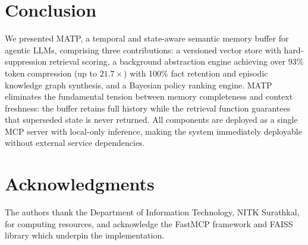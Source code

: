 \documentclass[lettersize,journal]{IEEEtran}
\begin{document}
\section{Conclusion}

We presented MATP, a temporal and state-aware semantic memory buffer for agentic LLMs, comprising three contributions: a versioned vector store with hard-suppression retrieval scoring, a background abstraction engine achieving over 93\% token compression (up to $21.7\times$) with 100\% fact retention and episodic knowledge graph synthesis, and a Bayesian policy ranking engine. MATP eliminates the fundamental tension between memory completeness and context freshness: the buffer retains full history while the retrieval function guarantees that superseded state is never returned. All components are deployed as a single MCP server with local-only inference, making the system immediately deployable without external service dependencies.

\section*{Acknowledgments}
The authors thank the Department of Information Technology, NITK Surathkal, for computing resources, and acknowledge the FastMCP framework and FAISS library which underpin the implementation.
\end{document}
